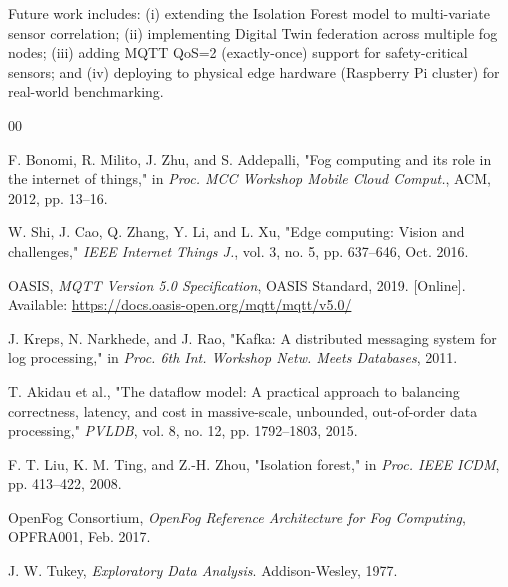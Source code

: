 \documentclass[conference]{IEEEtran}
\begin{document}
Future work includes: (i) extending the Isolation Forest model to multi-variate sensor correlation; (ii) implementing Digital Twin federation across multiple fog nodes; (iii) adding MQTT QoS=2 (exactly-once) support for safety-critical sensors; and (iv) deploying to physical edge hardware (Raspberry Pi cluster) for real-world benchmarking.

\begin{thebibliography}{00}

F. Bonomi, R. Milito, J. Zhu, and S. Addepalli, "Fog computing and its role in the internet of things," in \textit{Proc. MCC Workshop Mobile Cloud Comput.}, ACM, 2012, pp. 13--16.

W. Shi, J. Cao, Q. Zhang, Y. Li, and L. Xu, "Edge computing: Vision and challenges," \textit{IEEE Internet Things J.}, vol. 3, no. 5, pp. 637--646, Oct. 2016.

OASIS, \textit{MQTT Version 5.0 Specification}, OASIS Standard, 2019. [Online]. Available: \url{https://docs.oasis-open.org/mqtt/mqtt/v5.0/}

J. Kreps, N. Narkhede, and J. Rao, "Kafka: A distributed messaging system for log processing," in \textit{Proc. 6th Int. Workshop Netw. Meets Databases}, 2011.

T. Akidau et al., "The dataflow model: A practical approach to balancing correctness, latency, and cost in massive-scale, unbounded, out-of-order data processing," \textit{PVLDB}, vol. 8, no. 12, pp. 1792--1803, 2015.

F. T. Liu, K. M. Ting, and Z.-H. Zhou, "Isolation forest," in \textit{Proc. IEEE ICDM}, pp. 413--422, 2008.

OpenFog Consortium, \textit{OpenFog Reference Architecture for Fog Computing}, OPFRA001, Feb. 2017.

J. W. Tukey, \textit{Exploratory Data Analysis}. Addison-Wesley, 1977.

\end{thebibliography}
\end{document}
